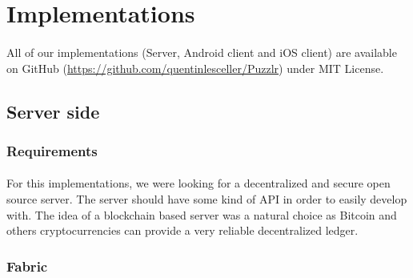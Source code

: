 \section{Implementations}
	\paragraph{}
	All of our implementations (Server, Android client and iOS client) are available on GitHub (\url{https://github.com/quentinlesceller/Puzzlr}) under MIT License.
	\subsection{Server side}
 		\subsubsection{Requirements}
 		 	\paragraph{}
 			For this implementations, we were looking for a decentralized and secure open source server. The server should have some kind of API in order to easily develop with. The idea of a blockchain based server was a natural choice as Bitcoin and others cryptocurrencies can provide a very reliable decentralized ledger.
 			\subsubsection{Fabric} 
